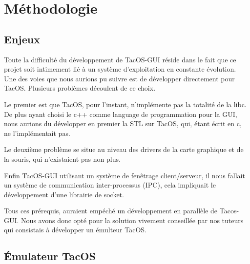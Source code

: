 \section{Méthodologie}

\subsection{Enjeux}

Toute la difficulté du développement de TacOS-GUI réside dans le fait que ce projet soit intimement lié à un système d'exploitation en constante évolution. Une des voies que nous aurions pu suivre est de développer directement pour TacOS. Plusieurs problèmes découlent de ce choix. 

Le premier est que TacOS, pour l'instant, n'implémente pas la totalité de la libc. De plus ayant choisi le c++ comme language de programmation pour la GUI, nous aurions du développer en premier la STL sur TacOS, qui, étant écrit en c, ne l'implémentait pas.

Le deuxième problème se situe au niveau des drivers de la carte graphique et de la souris, qui n'existaient pas non plus.

Enfin TacOS-GUI utilisant un système de fenêtrage client/serveur, il nous fallait un système de communication inter-processus (IPC), cela impliquait le développement d'une librairie de socket.

Tous ces prérequis, auraient empéché un développement en parallèle de Tacos-GUI. Nous avons donc opté pour la solution vivement conseillée par nos tuteurs qui consistais à développer un émulteur TacOS.

\subsection{Émulateur TacOS}
